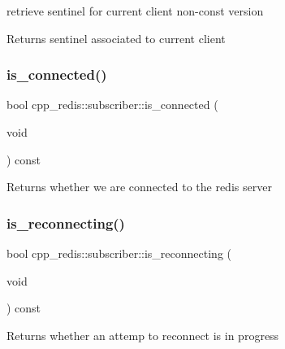 retrieve sentinel for current client non-\/const version

\begin{DoxyReturn}{Returns}
sentinel associated to current client 
\end{DoxyReturn}
\mbox{\label{classcpp__redis_1_1subscriber_a13ff83c3944b33851dfcf364f53b146c}} 
\subsubsection{\texorpdfstring{is\+\_\+connected()}{is\_connected()}}
{\footnotesize\ttfamily bool cpp\+\_\+redis\+::subscriber\+::is\+\_\+connected (\begin{DoxyParamCaption}\item[{void}]{ }\end{DoxyParamCaption}) const}

\begin{DoxyReturn}{Returns}
whether we are connected to the redis server 
\end{DoxyReturn}
\mbox{\label{classcpp__redis_1_1subscriber_a32eb4feb4858c972ebb9887d21cb62d7}} 
\subsubsection{\texorpdfstring{is\+\_\+reconnecting()}{is\_reconnecting()}}
{\footnotesize\ttfamily bool cpp\+\_\+redis\+::subscriber\+::is\+\_\+reconnecting (\begin{DoxyParamCaption}\item[{void}]{ }\end{DoxyParamCaption}) const}

\begin{DoxyReturn}{Returns}
whether an attemp to reconnect is in progress 
\end{DoxyReturn}
\mbox{\label{classcpp__redis_1_1subscriber_a52605edb2a85d370680c3c9e1b84fc3b}} 
